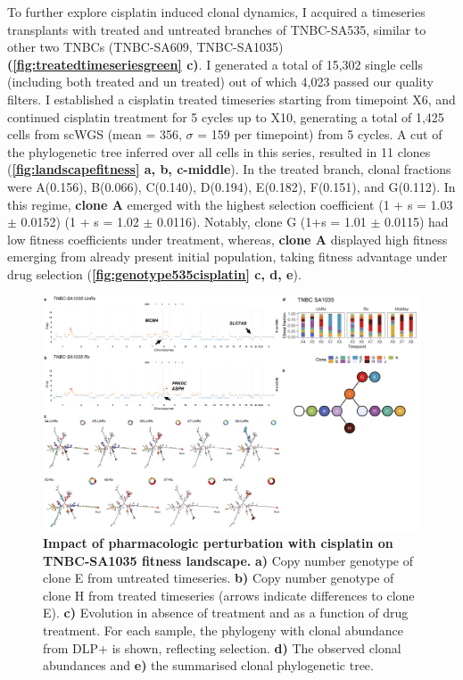  
To further explore cisplatin induced clonal dynamics, I acquired a timeseries transplants with treated and untreated branches of TNBC-SA535, similar to other two TNBCs (TNBC-SA609, TNBC-SA1035) \textbf{(\autoref{fig:treatedtimeseriesgreen} c)}.
I generated a total of 15,302 single cells (including both treated and un treated) out of which 4,023 passed our quality filters.
I established a cisplatin treated timeseries starting from timepoint X6, and continued cisplatin treatment for 5 cycles up to X10, generating a total of 1,425 cells from scWGS (mean = 356, $\sigma$ = 159 per timepoint) from 5 cycles. A cut of the phylogenetic tree inferred over all cells in this series, resulted in 11 clones (\textbf{\autoref{fig:landscapefitness} a, b, c-middle}). 
In the treated branch, clonal fractions were A(0.156), B(0.066), C(0.140), D(0.194), E(0.182), F(0.151), and G(0.112). In this regime, \textbf{clone A} emerged with the highest selection coefficient (1 + s = 1.03 $\pm$  0.0152) (1 + s = 1.02 $\pm$ 0.0116). Notably, clone G (1+s = 1.01 $\pm$ 0.0115) had low fitness coefficients under treatment, whereas, \textbf{clone A} displayed high fitness emerging from already present initial population, taking fitness advantage under drug selection (\textbf{\autoref{fig:genotype535cisplatin} c, d, e}).


\begin{figure}
\centering
\includegraphics[width=\textwidth]{Figures/chap4/genePlot1035.png}
\caption[Impact of pharmacologic perturbation with cisplatin on TNBC-SA1035 fitness landscape.]
	{\small
	\textbf{Impact of pharmacologic perturbation with cisplatin on TNBC-SA1035 fitness landscape.}
	    \textbf{a)} Copy number genotype of clone E from untreated timeseries. \textbf{b)} Copy number genotype of clone H from treated timeseries (arrows indicate differences to clone E). \textbf{c)}  Evolution in absence of treatment and as a function of drug treatment. For each sample, the phylogeny with clonal abundance from DLP+ is shown, reflecting selection. \textbf{d)} The observed clonal abundances and \textbf{e)} the summarised clonal phylogenetic tree.}
\label{fig:genotype1035}
\end{figure}

